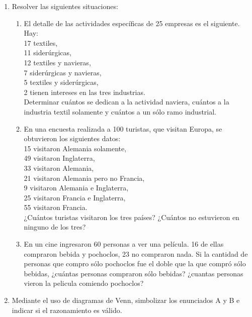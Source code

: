 \documentclass[a4paper]{article}
\newcommand{\exercise}{\item}
\newcommand{\intersec}{\cap}
\newcommand{\union}{\cup}
\newcommand{\symdiff}{\Delta}
\begin{document}
\begin{enumerate}
\begin{multicols}{2}
\begin{enumerate} [label=(\alph*)]
		\item $[C \setminus (A \union B)] \union (A \intersec B \intersec C) = C \setminus (A \symdiff B)$
		\item $(A \symdiff B) \setminus C = [A \setminus (B \union C)] \union [B \setminus (A \union C)]$
	\end{enumerate}
	\end{multicols}
	\exercise Resolver las siguientes situaciones:
	\begin{enumerate} [label=(\alph*)]
		\item El detalle de las actividades específicas de 25 empresas es el siguiente. Hay: \\ 17 textiles, \\ 11 siderúrgicas, \\ 12 textiles y navieras, \\ 7 siderúrgicas y navieras, \\ 5 textiles y siderúrgicas, \\ 2 tienen intereses en las tres industrias. \\ Determinar cuántos se dedican a la actividad naviera, cuántos a la industria textil solamente y cuántos a un sólo ramo industrial. 
		\item En una encuesta realizada a 100 turistas, que visitan Europa, se obtuvieron los siguientes datos: \\ 15 visitaron Alemania solamente, \\ 49 visitaron Inglaterra, \\ 33 visitaron Alemania, \\ 21 visitaron Alemania pero no Francia, \\ 9 visitaron Alemania e Inglaterra, \\25 visitaron Francia e Inglaterra, \\	55 visitaron Francia. \\ ¿Cuántos turistas visitaron los tres países? ¿Cuántos no estuvieron en ninguno de los tres?
		\item En un cine ingresaron 60 personas a ver una película. 16 de ellas compraron bebida y pochoclos, 23 no compraron nada. Si la cantidad de personas que compro sólo pochoclos fue el doble que la que compró sólo bebidas, ¿cuántas personas compraron sólo bebidas? ¿cuantas personas vieron la pelicula comiendo pochoclos?
	\end{enumerate}
	\exercise Mediante el uso de diagramas de Venn, simbolizar los enunciados A y B e indicar si el razonamiento es válido.
	\begin{enumerate} [label=(\alph*)]

\end{enumerate}
\end{enumerate}
\end{document}
